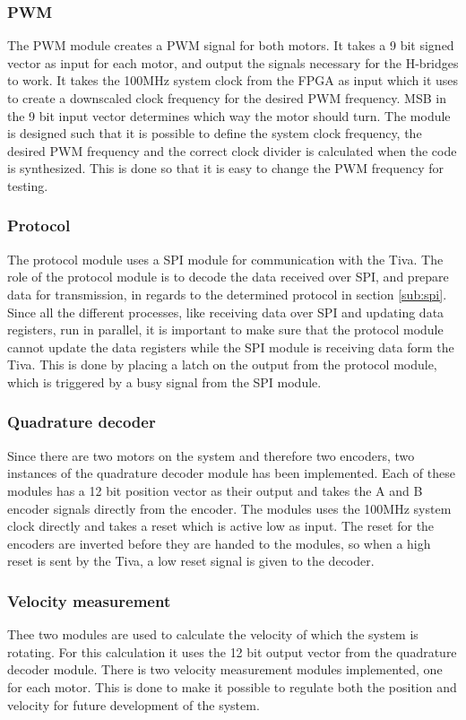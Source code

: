 \documentclass[../../../main]{subfiles}
\begin{document}
\subsubsection{PWM}
The PWM module creates a PWM signal for both motors. It takes a 9 bit signed vector as input for each motor, and output the signals necessary for the H-bridges to work.
It takes the 100MHz system clock from the FPGA as input which it uses to create a downscaled clock frequency for the desired PWM frequency.
MSB in the 9 bit input vector determines which way the motor should turn.
The module is designed such that it is possible to define the system clock frequency, the desired PWM frequency and the correct clock divider is calculated when the code is synthesized.
This is done so that it is easy to change the PWM frequency for testing.
\subsubsection{Protocol}
The protocol module uses a SPI module \cite{spi_git_module} for communication with the Tiva.
The role of the protocol module is to decode the data received over SPI, and prepare data for transmission, in regards to the determined protocol in section \ref{sub:spi}.
\\
Since all the different processes, like receiving data over SPI and updating data registers, run in parallel, it is important to make sure that the protocol module cannot update the data registers while the SPI module is receiving data form the Tiva.
This is done by placing a latch on the output from the protocol module, which is triggered by a busy signal from the SPI module.

\subsubsection{Quadrature decoder}
\label{subsubsec:Qdecoder_implement}
Since there are two motors on the system and therefore two encoders, two instances of the quadrature decoder module has been implemented.
Each of these modules has a 12 bit position vector as their output and takes the A and B encoder signals directly from the encoder. The modules uses the 100MHz system clock directly and takes a reset which is active low as input.
The reset for the encoders are inverted before they are handed to the modules, so when a high reset is sent by the Tiva, a low reset signal is given to the decoder.


\subsubsection{Velocity measurement}
Thee two modules are used to calculate the velocity of which the system is rotating. For this calculation it uses the 12 bit output vector from the quadrature decoder module.
There is two velocity measurement modules implemented, one for each motor.
This is done to make it possible to regulate both the position and velocity for future development of the system.
\end{document}

